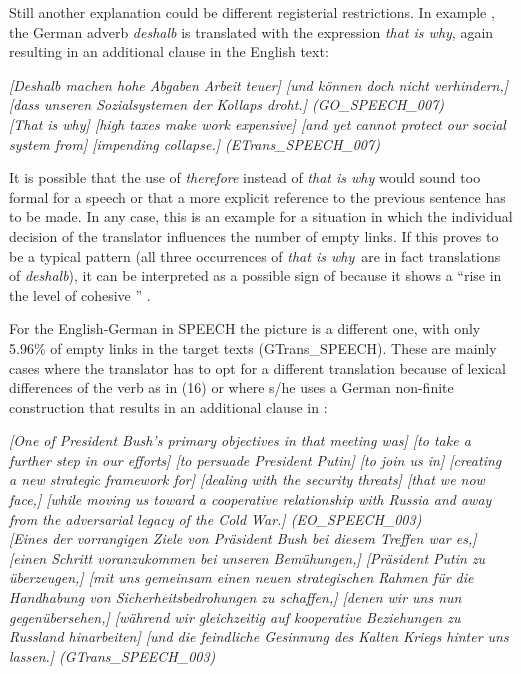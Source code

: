 \documentclass[output=paper]{LSP/langsci}
\begin{document}
\newpage 
Still another explanation could be different registerial restrictions. In example , the German adverb \textit{deshalb} is translated with the expression \textit{that is why}, again resulting in an additional clause in the English text: 


\ea \label{ex:culo:15}
   \ea \textit{[Deshalb machen hohe Abgaben Arbeit teuer] [und können doch nicht verhindern,]   [dass unseren Sozialsystemen der Kollaps droht.] \textup{(GO\_SPEECH\_007)}}\\
   \ex \textit{[That is why] [high taxes make work expensive] [and yet cannot protect our social system from] [impending collapse.] \textup{(ETrans\_SPEECH\_007)}}
   \z
\z

It is possible that the use of \textit{therefore} instead of \textit{that is why} would sound too formal for a speech or that a more explicit reference to the previous sentence has to be made. In any case, this is an example for a situation in which the individual decision of the translator influences the number of empty links. If this proves to be a typical pattern (all three occurrences of \textit{that is why}~are in fact translations of \textit{deshalb}), it can be interpreted as a possible sign of  because it shows a ``rise in the level of cohesive '' \citep[19]{Blum-Kulka1986}. 

For the  English-German in SPEECH the picture is a different one, with only 5.96\% of empty links in the target texts (GTrans\_SPEECH). These are mainly cases where the translator has to opt for a different translation because of lexical differences of the verb as in (16) or where s/he uses a German non-finite construction that results in an additional clause in :

\ea \label{ex:culo:16}
   \ea \textit{[One of President Bush's primary objectives in that meeting was] [to take a further step in our efforts] [to persuade President Putin] [to join us in] [creating a new strategic   framework for] [dealing with the security threats] [that we now face,] [while moving us   toward a cooperative relationship with Russia and away from the adversarial legacy of the Cold War.] \textup{(EO\_SPEECH\_003)}}\\
    \ex \textit{[Eines der vorrangigen Ziele von Präsident Bush bei diesem Treffen war es,] [einen   Schritt voranzukommen bei unseren Bemühungen,] [Präsident Putin zu überzeugen,] [mit uns gemeinsam einen neuen strategischen Rahmen für die Handhabung von   Sicherheitsbedrohungen zu schaffen,] [denen wir uns nun gegenübersehen,] [während wir gleichzeitig auf kooperative Beziehungen zu Russland hinarbeiten] [und die feindliche Gesinnung des Kalten Kriegs hinter uns lassen.] \textup{(GTrans\_SPEECH\_003)}}
    \z
\z
\end{document}
